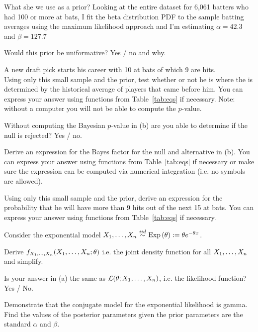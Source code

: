 \documentclass[12pt]{article}
\begin{document}
What she we use as a prior? Looking at the entire dataset for 6,061 batters who had 100 or more at bats, I fit the beta distribution PDF to the sample batting averages using the maximum likelihood approach and I'm estimating $\alpha = 42.3$ and $\beta = 127.7$

\benum

 Would this prior be uniformative? Yes / no and why. 

 A new draft pick starts his career with 10 at bats of which 9 are hits. \\

Using only this small sample and the prior, test whether or not he is  where the  is determined by the historical average of players that came before him. You can express your answer using functions from Table~\ref{tab:eqs} if necessary. Note: without a computer you will not be able to compute the $p$-value. 


 Without computing the Bayesian $p$-value in (b) are you able to determine if the null is rejected? Yes / no.

 Derive an expression for the Bayes factor for the null and alternative in (b). You can express your answer using functions from Table~\ref{tab:eqs} if necessary or make sure the expression can be computed via numerical integration (i.e. no symbols are allowed). 


 Using only this small sample and the prior, derive an expression for the probability that he will have more than 9 hits out of the next 15 at bats. You can express your answer using functions from Table~\ref{tab:eqs} if necessary. 


\eenum

\problem Consider the exponential model $\Xoneton \iid \exponential{\theta} := \theta e^{-\theta x}$.

\benum

 Derive $f_{X_1, \ldots, X_n}(X_1, \ldots, X_n; \theta)$ i.e. the joint density function for all $X_1, \ldots, X_n$ and simplify.  

 Is your answer in (a) the same as $\mathcal{L}(\theta; X_1, \ldots, X_n)$, i.e. the likelihood function? Yes / No. 


 Demonstrate that the conjugate model for the exponential likelihood is gamma. Find the values of the posterior parameters given the prior parameters are the standard $\alpha$ and $\beta$. 
\end{document}
